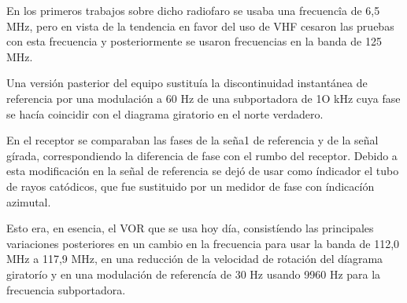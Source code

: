 En los primeros trabajos sobre dicho radiofaro se usaba una frecuencîa de 6,5 MHz, 
pero en vista de la tendencia en favor del uso de VHF
cesaron las pruebas con esta frecuencia y posteriormente se usaron frecuencias en la banda de 125 MHz.

Una versi\'on pasterior del equipo sustituía la discontinuidad instantánea de referencia
 por una modulaci\'on a 60 Hz de una subportadora de 1O kHz cuya fase se hacía coincidir con el diagrama
 giratorio en el norte verdadero.

En el receptor se comparaban las fases de la se\~na1 de referencia y de
la se\~nal g\'irada, correspondiendo la diferencia de fase con el rumbo
del receptor. Debido a esta modificaci\'on en la se\~nal de referencia 
se dej\'o de usar como \'indicador el tubo de rayos catódicos, 
que fue sustituido
por un medidor de fase con \'indicac\'i\'on azimutal.

Esto era, en esencia, el VOR que se usa hoy día, consist\'iendo las
principales variaciones posteriores en un cambio en la frecuencia para
usar la banda de 112,0 MHz a 117,9 MHz, en una reducción de la velocidad 
de rotaci\'on del d\'iagrama girator\'io y en una modulación de referenc\'ia
 de 30 Hz usando 9960 Hz para la frecuencia subportadora.






